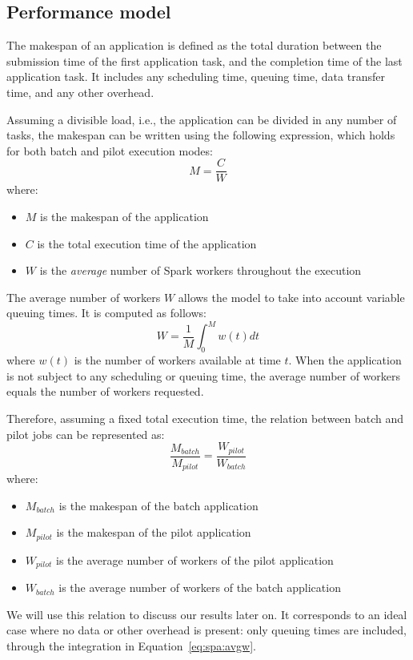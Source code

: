     
	\subsection{Performance model}
    
	The makespan of an application is defined as the total duration between
	the submission time of the first application task, and the completion
	time of the last application task. It includes any scheduling time,
	queuing time, data transfer time, and any other overhead.
	
	Assuming a divisible load, i.e., the application can be divided in any
	number of tasks, the makespan can be written using the following
	expression, which holds for both batch and pilot execution modes:
	\begin{equation}
	    M = \frac{C}{W} \label{eq:mcw}
	\end{equation}
	where:
	\begin{itemize}
	    \item $M$ is the makespan of the application
	    \item $C$ is the total execution time of the application
	    \item $W$ is the \emph{average} number of Spark workers throughout
	    the execution
	\end{itemize}
	The average number of workers $W$ allows the model to take into account
	 variable queuing times. It is computed as follows:
	\begin{equation}
	    W = \frac{1}{M}\int_0^M{w(t)dt}\label{eq:spa:avgw}
	\end{equation}
	where $w(t)$ is the number of workers available at time $t$. When the
	application is not subject to any scheduling or queuing time, the
	average number of workers equals the number of workers requested. 
    
	Therefore, assuming a fixed total execution time, the relation between
	batch and pilot jobs can be represented as:
	\begin{equation}
	    \frac{M_{batch}}{M_{pilot}} = \frac{W_{pilot}}{W_{batch}}\label{eq:spa:makespancomp}
	\end{equation}
	where:
	\begin{itemize}
	    \item $M_{batch}$ is the makespan of the batch application
	    \item $M_{pilot}$ is the makespan of the pilot application
	    \item $W_{pilot}$ is the average number of workers of the pilot
	    application
	    \item $W_{batch}$ is the average number of workers of the batch
	    application
	\end{itemize}
	We will use this relation to discuss our results later on. It
	corresponds to an ideal case where no data or other overhead is present:
	only queuing times are included, through the integration in
	Equation~\ref{eq:spa:avgw}.
    
